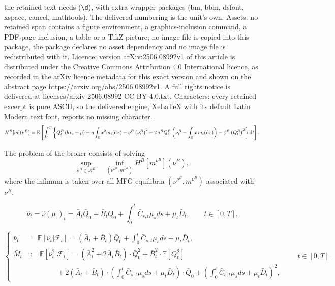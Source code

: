 \documentclass[10pt,a4paper]{amsart}
\def\d{\mathrm{d}}
\begin{document}
the retained text needs (\texttt{\textbackslash d}), with extra wrapper packages (bm, bbm, dsfont, xspace, cancel, mathtools). The delivered numbering is the unit's own. Assets: no retained span contains a figure environment, a graphics-inclusion command, a PDF-page inclusion, a table or a TikZ picture; no image file is copied into this package, the package declares no asset dependency and no image file is redistributed with it. Licence: version arXiv:2506.08992v1 of this article is distributed under the Creative Commons Attribution 4.0 International licence, as recorded in the arXiv licence metadata for this exact version and shown on the abstract page https://arxiv.org/abs/2506.08992v1. A full rights notice is delivered at licenses/arxiv-2506.08992-CC-BY-4.0.txt. Characters: every retained excerpt is pure ASCII, so the delivered engine, XeLaTeX with its default Latin Modern text font, reports no missing character.
\begin{equation}\label{broker_obj_infinite}
\scalebox{0.9}{$
\begin{aligned}
    H^{B}[m](\nu^B) = \mathbb{E} \left[ \int_0^T \left\{ Q^B_t \left(b\,\bar \nu_t + \mu \right) + \eta \int_{\mathbb{R}} x^2 m_t(\d x) - \eta^B \left( \nu^B_t \right)^2 - 2\,a^B Q^B_t \left( \nu^B_t - \int_\mathbb{R} x\, m_t(\d x) \right) - \phi^B \left( Q^B_t \right)^2 \right\} \d t \right].
\end{aligned}
$}
\end{equation}

\begin{definition}\label{majorsol}
The problem of the broker consists of solving
$$\underset{\nu^B \in \mathcal{A}^B}{\sup} \quad \underset{(\nu^{\nu^B}, m^{\nu^B})}{\inf} H^{B}[m^{\nu^B}] (\nu^B),$$
where the infimum is taken over all MFG equilibria $(\nu^{\nu^B}, m^{\nu^B})$ associated with $\nu^B$.
\end{definition}

\begin{equation}\label{hatnu_solution}
\hat{\nu}_t = \hat{\nu}(\mu_\cdot)_t = \bar{A}_t \bar{Q}_0 + \bar{B}_t Q_0 + \int_0^t \bar{C}_{s,t} \mu_s ds + \mu_t \bar{D}_t, \qquad t \in [0,T].
\end{equation}

\begin{equation}\label{first_second_conditional_moment_of_hatnu}
\left\{
\begin{aligned}
    \bar \nu_t &= \mathbb E [\hat \nu_t | \mathcal F_t] = ( \bar A_t +\bar B_t ) \bar Q_0 + \int_0^t \bar C_{s,t} \mu_s   ds+ \mu_t \bar D_t, \\
    \bar M_t   &:= \mathbb E [\hat \nu_t^2 | \mathcal F_t] = \left( \bar A_t^2 + 2 \bar A_t \bar B_t \right) \cdot \bar Q_0^2 + \bar B_t^2 \cdot \mathbb E[Q_0^2] \\
     & \qquad\qquad + 2 \left( \bar A_t + \bar B_t \right) \cdot \left( \int_0^t \bar C_{s,t} \mu_s   ds+ \mu_t \bar D_t \right) \cdot \bar Q_0 + \left( \int_0^t \bar C_{s,t} \mu_s   ds+ \mu_t \bar D_t \right)^2,
\end{aligned}
\right.\qquad t \in [0,T].
\end{equation}
\end{document}
